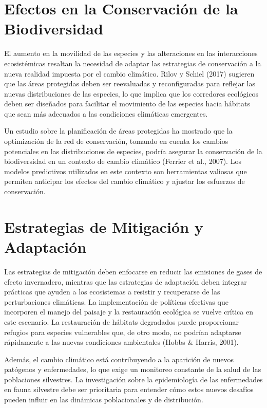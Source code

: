 \documentclass[
  letterpaper,
  DIV=11,
  numbers=noendperiod,
  oneside]{scrreprt}
\begin{document}
\section{Efectos en la Conservación de la
Biodiversidad}\label{efectos-en-la-conservaciuxf3n-de-la-biodiversidad}

El aumento en la movilidad de las especies y las alteraciones en las
interacciones ecosistémicas resaltan la necesidad de adaptar las
estrategias de conservación a la nueva realidad impuesta por el cambio
climático. Rilov y Schiel (2017) sugieren que las áreas protegidas deben
ser reevaluadas y reconfiguradas para reflejar las nuevas distribuciones
de las especies, lo que implica que los corredores ecológicos deben ser
diseñados para facilitar el movimiento de las especies hacia hábitats
que sean más adecuados a las condiciones climáticas emergentes.

Un estudio sobre la planificación de áreas protegidas ha mostrado que la
optimización de la red de conservación, tomando en cuenta los cambios
potenciales en las distribuciones de especies, podría asegurar la
conservación de la biodiversidad en un contexto de cambio climático
(Ferrier et al., 2007). Los modelos predictivos utilizados en este
contexto son herramientas valiosas que permiten anticipar los efectos
del cambio climático y ajustar los esfuerzos de conservación.

\section{Estrategias de Mitigación y
Adaptación}\label{estrategias-de-mitigaciuxf3n-y-adaptaciuxf3n}

Las estrategias de mitigación deben enfocarse en reducir las emisiones
de gases de efecto invernadero, mientras que las estrategias de
adaptación deben integrar prácticas que ayuden a los ecosistemas a
resistir y recuperarse de las perturbaciones climáticas. La
implementación de políticas efectivas que incorporen el manejo del
paisaje y la restauración ecológica se vuelve crítica en este escenario.
La restauración de hábitats degradados puede proporcionar refugios para
especies vulnerables que, de otro modo, no podrían adaptarse rápidamente
a las nuevas condiciones ambientales (Hobbs \& Harris, 2001).

Además, el cambio climático está contribuyendo a la aparición de nuevos
patógenos y enfermedades, lo que exige un monitoreo constante de la
salud de las poblaciones silvestres. La investigación sobre la
epidemiología de las enfermedades en fauna silvestre debe ser
prioritaria para entender cómo estos nuevos desafíos pueden influir en
las dinámicas poblacionales y de distribución.
\end{document}
